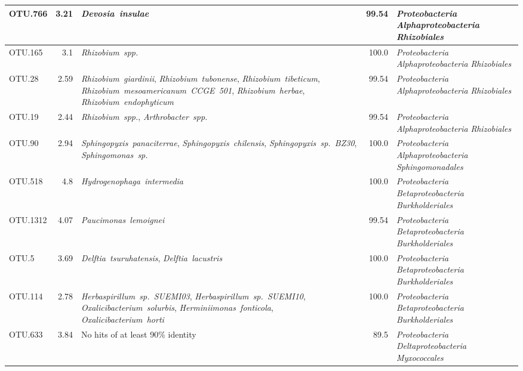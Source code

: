 \begin{longtable}{lrP{5cm}rP{7cm}}
OTU.766 & 3.21 & \mbox{\textit{Devosia insulae}} & 99.54 & \mbox{\textit{Proteobacteria}} \mbox{\textit{Alphaproteobacteria}} \mbox{\textit{Rhizobiales}} \\ \midrule
OTU.165 & 3.1 & \mbox{\textit{Rhizobium spp.}} & 100.0 & \mbox{\textit{Proteobacteria}} \mbox{\textit{Alphaproteobacteria}} \mbox{\textit{Rhizobiales}} \\ \midrule
OTU.28 & 2.59 & \mbox{\textit{Rhizobium giardinii}}, \mbox{\textit{Rhizobium tubonense}}, \mbox{\textit{Rhizobium tibeticum}}, \mbox{\textit{Rhizobium mesoamericanum CCGE 501}}, \mbox{\textit{Rhizobium herbae}}, \mbox{\textit{Rhizobium endophyticum}} & 99.54 & \mbox{\textit{Proteobacteria}} \mbox{\textit{Alphaproteobacteria}} \mbox{\textit{Rhizobiales}} \\ \midrule
OTU.19 & 2.44 & \mbox{\textit{Rhizobium spp.}}, \mbox{\textit{Arthrobacter spp.}} & 99.54 & \mbox{\textit{Proteobacteria}} \mbox{\textit{Alphaproteobacteria}} \mbox{\textit{Rhizobiales}} \\ \midrule
OTU.90 & 2.94 & \mbox{\textit{Sphingopyxis panaciterrae}}, \mbox{\textit{Sphingopyxis chilensis}}, \mbox{\textit{Sphingopyxis sp. BZ30}}, \mbox{\textit{Sphingomonas sp.}} & 100.0 & \mbox{\textit{Proteobacteria}} \mbox{\textit{Alphaproteobacteria}} \mbox{\textit{Sphingomonadales}} \\ \midrule
OTU.518 & 4.8 & \mbox{\textit{Hydrogenophaga intermedia}} & 100.0 & \mbox{\textit{Proteobacteria}} \mbox{\textit{Betaproteobacteria}} \mbox{\textit{Burkholderiales}} \\ \midrule
OTU.1312 & 4.07 & \mbox{\textit{Paucimonas lemoignei}} & 99.54 & \mbox{\textit{Proteobacteria}} \mbox{\textit{Betaproteobacteria}} \mbox{\textit{Burkholderiales}} \\ \midrule
OTU.5 & 3.69 & \mbox{\textit{Delftia tsuruhatensis}}, \mbox{\textit{Delftia lacustris}} & 100.0 & \mbox{\textit{Proteobacteria}} \mbox{\textit{Betaproteobacteria}} \mbox{\textit{Burkholderiales}} \\ \midrule
OTU.114 & 2.78 & \mbox{\textit{Herbaspirillum sp. SUEMI03}}, \mbox{\textit{Herbaspirillum sp. SUEMI10}}, \mbox{\textit{Oxalicibacterium solurbis}}, \mbox{\textit{Herminiimonas fonticola}}, \mbox{\textit{Oxalicibacterium horti}} & 100.0 & \mbox{\textit{Proteobacteria}} \mbox{\textit{Betaproteobacteria}} \mbox{\textit{Burkholderiales}} \\ \midrule
OTU.633 & 3.84 & {No hits of at least 90\% identity} & 89.5 & \mbox{\textit{Proteobacteria}} \mbox{\textit{Deltaproteobacteria}} \mbox{\textit{Myxococcales}} \\ \midrule

\end{longtable}
